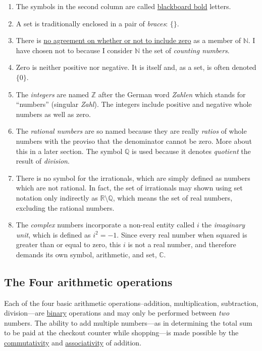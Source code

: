 \documentclass[
  a4paper,
]{article}
\begin{document}
\begin{enumerate}
\item
  The symbols in the second column are called
  \href{https://oeis.org/wiki/Blackboard_bold}{blackboard bold} letters.
\item
  A set is traditionally enclosed in a pair of \emph{braces}: \(\{\}\).
\item
  There is \href{https://en.wikipedia.org/wiki/Natural_number}{no
  agreement on whether or not to include zero} as a member of
  \(\mathbb{N}\). I have chosen not to because I consider \(\mathbb{N}\)
  the set of \emph{counting numbers}.
\item
  Zero is neither positive nor negative. It is itself and, as a set, is
  often denoted \(\{0\}\).
\item
  The \emph{integers} are named \(\mathbb{Z}\) after the German word
  \emph{Zahlen} which stands for ``numbers'' (singular \emph{Zahl}). The
  integers include positive and negative whole numbers as well as zero.
\item
  The \emph{rational numbers} are so named because they are really
  \emph{ratios} of whole numbers with the proviso that the denominator
  cannot be zero. More about this in a later section. The symbol
  \(\mathbb{Q}\) is used because it denotes \emph{quotient} the result
  of \emph{division}.
\item
  There is no symbol for the irrationals, which are simply defined as
  numbers which are not rational. In fact, the set of irrationals may
  shown using set notation only indirectly as
  \(\mathbb{R}\setminus\mathbb{Q}\), which means the set of real
  numbers, excluding the rational numbers.
\item
  The \emph{complex} numbers incorporate a non-real entity called \(i\)
  the \emph{imaginary unit}, which is defined as \(i^2 = -1\). Since
  every real number when squared is greater than or equal to zero, this
  \(i\) is not a real number, and therefore demands its own symbol,
  arithmetic, and set, \(\mathbb{C}\).
\end{enumerate}

\hypertarget{the-four-arithmetic-operations}{%
\subsection{The Four arithmetic
operations}\label{the-four-arithmetic-operations}}

Each of the four basic arithmetic operations--addition, multiplication,
subtraction, division---are
\href{https://en.wikipedia.org/w/index.php?title=Binary_operation\&oldid=1182322931}{binary}
operations and may only be performed between \emph{two} numbers. The
ability to add multiple numbers---as in determining the total sum to be
paid at the checkout counter while shopping---is made possible by the
\href{https://en.wikipedia.org/wiki/Commutative_property}{commutativity}
and
\href{https://en.wikipedia.org/wiki/Associative_property}{associativity}
of addition.
\end{document}
